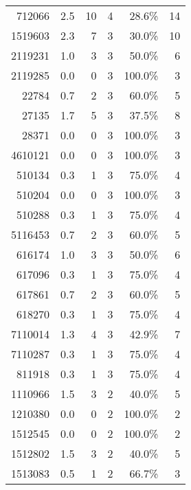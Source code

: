 \begin{longtable}{lrrrrr}
	    \multicolumn{1}{r}{712066} & 2.5   & 10    & 4     & 28.6\% & 14 \\
	    \multicolumn{1}{r}{1519603} & 2.3   & 7     & 3     & 30.0\% & 10 \\
	    \multicolumn{1}{r}{2119231} & 1.0   & 3     & 3     & 50.0\% & 6 \\
	    \multicolumn{1}{r}{2119285} & 0.0   & 0     & 3     & 100.0\% & 3 \\
	    \multicolumn{1}{r}{22784} & 0.7   & 2     & 3     & 60.0\% & 5 \\
	    \multicolumn{1}{r}{27135} & 1.7   & 5     & 3     & 37.5\% & 8 \\
	    \multicolumn{1}{r}{28371} & 0.0   & 0     & 3     & 100.0\% & 3 \\
	    \multicolumn{1}{r}{4610121} & 0.0   & 0     & 3     & 100.0\% & 3 \\
	    \multicolumn{1}{r}{510134} & 0.3   & 1     & 3     & 75.0\% & 4 \\
	    \multicolumn{1}{r}{510204} & 0.0   & 0     & 3     & 100.0\% & 3 \\
	    \multicolumn{1}{r}{510288} & 0.3   & 1     & 3     & 75.0\% & 4 \\
	    \multicolumn{1}{r}{5116453} & 0.7   & 2     & 3     & 60.0\% & 5 \\
	    \multicolumn{1}{r}{616174} & 1.0   & 3     & 3     & 50.0\% & 6 \\
	    \multicolumn{1}{r}{617096} & 0.3   & 1     & 3     & 75.0\% & 4 \\
	    \multicolumn{1}{r}{617861} & 0.7   & 2     & 3     & 60.0\% & 5 \\
	    \multicolumn{1}{r}{618270} & 0.3   & 1     & 3     & 75.0\% & 4 \\
	    \multicolumn{1}{r}{7110014} & 1.3   & 4     & 3     & 42.9\% & 7 \\
	    \multicolumn{1}{r}{7110287} & 0.3   & 1     & 3     & 75.0\% & 4 \\
	    \multicolumn{1}{r}{811918} & 0.3   & 1     & 3     & 75.0\% & 4 \\
	    \multicolumn{1}{r}{1110966} & 1.5   & 3     & 2     & 40.0\% & 5 \\
	    \multicolumn{1}{r}{1210380} & 0.0   & 0     & 2     & 100.0\% & 2 \\
	    \multicolumn{1}{r}{1512545} & 0.0   & 0     & 2     & 100.0\% & 2 \\
	    \multicolumn{1}{r}{1512802} & 1.5   & 3     & 2     & 40.0\% & 5 \\
	    \multicolumn{1}{r}{1513083} & 0.5   & 1     & 2     & 66.7\% & 3 \\

\end{longtable}
